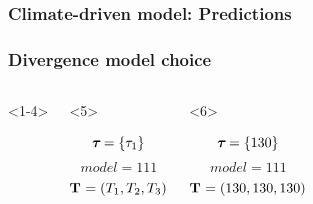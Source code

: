 \begin{frame}
    \frametitle<1-4>{Climate-driven model: Predictions}
    \frametitle<5->{Divergence model choice}
    \begin{columns}[c]
        \begin{onlyenv}<1-4>
            \begin{minipage}[c][0.5\textheight][c]{\linewidth}
            \end{minipage}
        \end{onlyenv}
        \begin{onlyenv}<5>
            \begin{minipage}[c][0.5\textheight][c]{\linewidth}
                \begin{displaybox}[0.95\linewidth]
                    \begin{minipage}[c][0.45\textheight][c]{0.95\linewidth}
                        \[
                            \boldsymbol{\tau_{}} = \{\tau_{1}\}
                        \]\vspace{0mm}
                        \[
                            model = 111
                        \]\vspace{0mm}
                        \[
                            \mathbf{T_{}} = (T_{1},T_{2},T_{3})
                        \]\vspace{0mm}
                    \end{minipage}
                \end{displaybox}
            \end{minipage}
        \end{onlyenv}
        \begin{onlyenv}<6>
            \begin{minipage}[c][0.5\textheight][c]{\linewidth}
                \begin{displaybox}[0.95\linewidth]
                    \begin{minipage}[c][0.45\textheight][c]{0.95\linewidth}
                        \[
                            \boldsymbol{\tau_{}} = \{130\}
                        \]\vspace{0mm}
                        \[
                            model = 111
                        \]\vspace{0mm}
                        \[
                            \mathbf{T_{}} = (130,130,130)
                        \]\vspace{0mm}

\end{minipage}
\end{displaybox}
\end{minipage}
\end{onlyenv}
\end{columns}
\end{frame}
